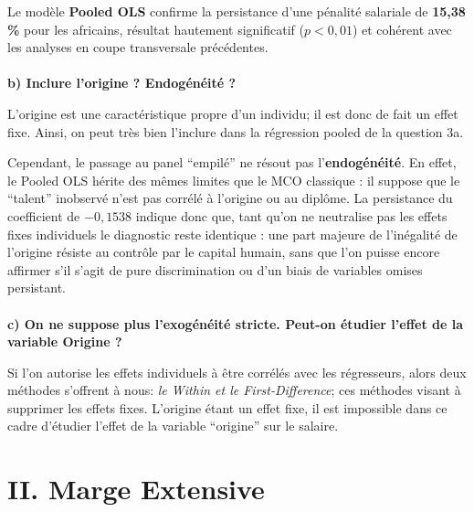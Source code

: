 \documentclass[
  letterpaper,
  DIV=11,
  numbers=noendperiod]{scrartcl}
\makeatletter
\let\oldparagraph\paragraph
\renewcommand{\paragraph}{
    \@ifstar
      \xxxParagraphStar
      \xxxParagraphNoStar
  }
\newcommand{\xxxParagraphStar}[1]{\oldparagraph*{#1}\mbox{}}
\newcommand{\xxxParagraphNoStar}[1]{\oldparagraph{#1}\mbox{}}
\makeatother
\begin{document}
Le modèle \textbf{Pooled OLS} confirme la persistance d'une pénalité
salariale de \textbf{15,38 \%} pour les africains, résultat hautement
significatif (\(p < 0,01\)) et cohérent avec les analyses en coupe
transversale précédentes.

\paragraph{\texorpdfstring{\textbf{b) Inclure l'origine ? Endogénéité
?}}{b) Inclure l'origine ? Endogénéité ?}}\label{b-inclure-lorigine-endoguxe9nuxe9ituxe9}

L'origine est une caractéristique propre d'un individu; il est donc de
fait un effet fixe. Ainsi, on peut très bien l'inclure dans la
régression pooled de la question 3a.

Cependant, le passage au panel ``empilé'' ne résout pas
l'\textbf{endogénéité}. En effet, le Pooled OLS hérite des mêmes limites
que le MCO classique : il suppose que le ``talent'' inobservé n'est pas
corrélé à l'origine ou au diplôme. La persistance du coefficient de
\(-0,1538\) indique donc que, tant qu'on ne neutralise pas les effets
fixes individuels le diagnostic reste identique : une part majeure de
l'inégalité de l'origine résiste au contrôle par le capital humain, sans
que l'on puisse encore affirmer s'il s'agit de pure discrimination ou
d'un biais de variables omises persistant.

\paragraph{\texorpdfstring{\textbf{c) On ne suppose plus l'exogénéité
stricte. Peut-on étudier l'effet de la variable Origine
?}}{c) On ne suppose plus l'exogénéité stricte. Peut-on étudier l'effet de la variable Origine ?}}\label{c-on-ne-suppose-plus-lexoguxe9nuxe9ituxe9-stricte.-peut-on-uxe9tudier-leffet-de-la-variable-origine}

Si l'on autorise les effets individuels à être corrélés avec les
régresseurs, alors deux méthodes s'offrent à nous: \emph{le Within et le
First-Difference}; ces méthodes visant à supprimer les effets fixes.
L'origine étant un effet fixe, il est impossible dans ce cadre d'étudier
l'effet de la variable ``origine'' sur le salaire.

\section{II. Marge Extensive}\label{ii.-marge-extensive}
\end{document}
